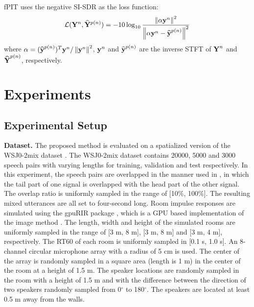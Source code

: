 \documentclass{article}
\begin{document}
fPIT uses the negative SI-SDR \cite{roux_sdr_2019} as the loss function:
\vspace*{-2mm}
\begin{equation}
   \mathcal{L}(\mathbf{Y}^n,\mathbf{\widehat{\mathbf{Y}}}^{p(n)}) 
   = -10 \log_{10}\frac{\left \| \alpha \boldsymbol{{\rm y}}^n \right \|^2}{\left \| \alpha \boldsymbol{{\rm y}}^n - \boldsymbol{{\rm \widehat{y}}}^{p(n)} \right \|^2}
  \label{eq8}
\end{equation}
where $\alpha=({\boldsymbol{{\rm \widehat{y}}}^{p(n)}})^T\boldsymbol{{\rm y}}^n/\left \| \boldsymbol{\rm y}^n \right \|^2$, $\boldsymbol{{\rm y}}^n$
and $\boldsymbol{{\rm \widehat{y}}}^{p(n)}$ are the inverse STFT of $\boldsymbol{{\rm Y}}^n$ and $\boldsymbol{{\rm \widehat{Y}}}^{p(n)}$, respectively.

\section{Experiments}
\label{sec:expset}

\subsection{Experimental Setup}

\textbf{Dataset.}
The proposed method is evaluated on a spatialized version of the WSJ0-2mix dataset \cite{hershey_deep_2016}.
The WSJ0-2mix dataset contains 20000, 5000 and 3000 speech pairs with varying lengths for training, validation and test respectively.
In this experiment, the speech pairs are overlapped in the manner used in \cite{luo_end--end_2020}, in which the tail part of one signal is overlapped with the head part of the other signal.
The overlap ratio is uniformly sampled in the range of [10\%, 100\%].
The resulting mixed utterances are all set to four-second long.
Room impulse responses are simulated using the gpuRIR package \cite{diaz-guerra_gpurir_2021}, which is a GPU based implementation of the image method \cite{allen_image_1979}.
The length, width and height of the simulated rooms are uniformly sampled in the range of [3 m, 8 m], [3 m, 8 m] and [3 m, 4 m], respectively.
The RT60 of each room is uniformly sampled in [0.1 s, 1.0 s].
An 8-channel circular microphone array with a radius of 5 cm is used.
The center of the array is randomly sampled in a square area (length is 1 m) in the center of the room at a height of 1.5 m.
The speaker locations are randomly sampled in the room with a height of 1.5 m and with the difference between the direction of two speakers randomly sampled from 0$^\circ$ to 180$^\circ$.
The speakers are located at least 0.5 m away from the walls.
\end{document}
